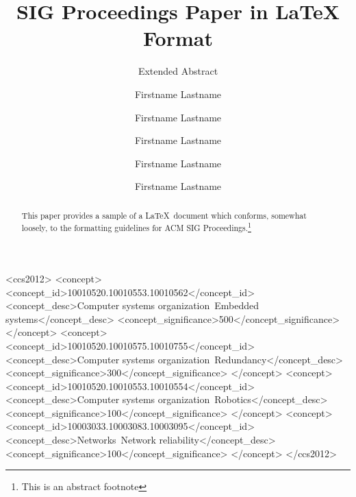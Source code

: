 \documentclass[sigconf]{acmart}
\begin{document}
\title{SIG Proceedings Paper in LaTeX Format}
\subtitle{Extended Abstract}

\author{Firstname Lastname}

\author{Firstname Lastname}

\author{Firstname Lastname}

\author{Firstname Lastname}

\author{Firstname Lastname}


\renewcommand{\shortauthors}{F. Lastname et al.}


\begin{abstract}
This paper provides a sample of a \LaTeX\ document which conforms,
somewhat loosely, to the formatting guidelines for
ACM SIG Proceedings.\footnote{This is an abstract footnote}
\end{abstract}

%
%
\begin{CCSXML}
<ccs2012>
 <concept>
  <concept_id>10010520.10010553.10010562</concept_id>
  <concept_desc>Computer systems organization~Embedded systems</concept_desc>
  <concept_significance>500</concept_significance>
 </concept>
 <concept>
  <concept_id>10010520.10010575.10010755</concept_id>
  <concept_desc>Computer systems organization~Redundancy</concept_desc>
  <concept_significance>300</concept_significance>
 </concept>
 <concept>
  <concept_id>10010520.10010553.10010554</concept_id>
  <concept_desc>Computer systems organization~Robotics</concept_desc>
  <concept_significance>100</concept_significance>
 </concept>
 <concept>
  <concept_id>10003033.10003083.10003095</concept_id>
  <concept_desc>Networks~Network reliability</concept_desc>
  <concept_significance>100</concept_significance>
 </concept>
</ccs2012>  
\end{CCSXML}
\end{document}
